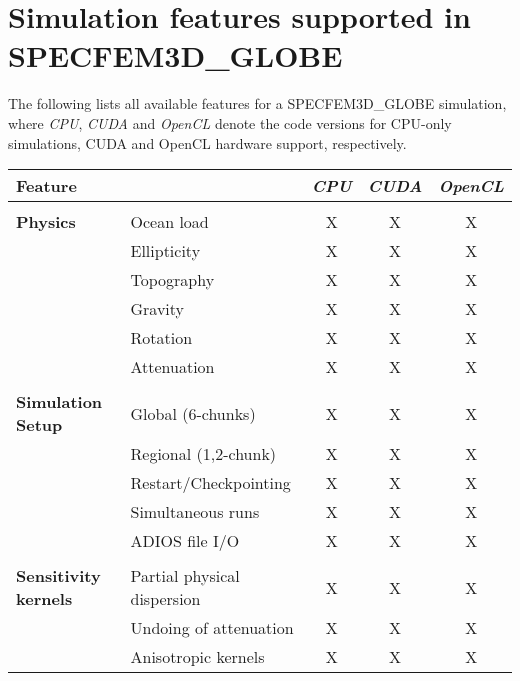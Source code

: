 \chapter*{Simulation features supported in SPECFEM3D\_GLOBE}

The following lists all available features for a SPECFEM3D\_GLOBE simulation,
where {\it CPU}, {\it CUDA} and {\it OpenCL} denote the code versions for CPU-only simulations,
CUDA and OpenCL hardware support, respectively.
%
\begin{table}[htp]
\label{table:features}
\begin{center}
\begin{tabular}{ l l c c c}
\hline
{\bf Feature}		&		& {\it CPU}	& {\it CUDA}	& {\it OpenCL} \\
\hline
& & & & \\
{\bf Physics}				& Ocean load			& X		& X		& X \\
								& Ellipticity             	& X		& X     	& X \\
								& Topography   			& X     	& X     	& X \\
								& Gravity            		& X     	& X     	& X \\
								& Rotation             	& X     	& X     	& X \\
								& Attenuation    		& X     	& X     	& X \\
\hline
& & & & \\
{\bf Simulation Setup}	& Global (6-chunks)			& X	& X	& X \\
									& Regional (1,2-chunk)		& X	& X	& X \\
									& Restart/Checkpointing	& X	& X	& X \\
									& Simultaneous runs			& X	& X	& X \\
									& ADIOS file I/O				& X	& X	& X \\
\hline
& & & & \\
{\bf Sensitivity kernels}	& Partial physical dispersion			& X     & X     & X \\
									& Undoing of attenuation    			& X     & X     & X \\
									& Anisotropic kernels        				& X     & X     & X \\

\end{tabular}
\end{center}
\end{table}
